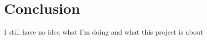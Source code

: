 \documentclass{article}
\begin{document}
\section{Conclusion}
I still have no idea what I'm doing and what this project is about








\end{document}
